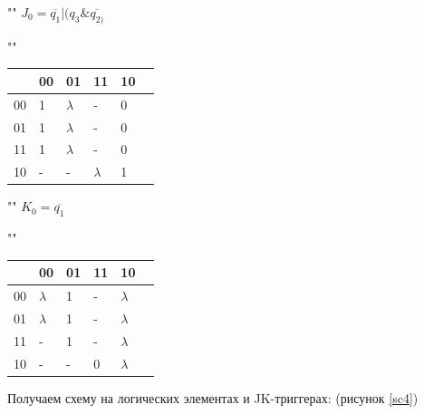 \begin{center}
	""\newline\newline
	$J_{0} = \overline{q_{1}} | (q_{3} \& \overline{q_{2)}}$
	
	""\newline
	\begin{tabular}{ | l | l | l | l | l | p{1cm} |}
		\hline
		\diagbox[width=5em]{$q_{3}q_{2}$}{$q_{1}q_{0}$} & 00 & 01 & 11 & 10 \\\hline
		00 & \cellcolor{blue!25} 1  & \cellcolor{blue!25} $\lambda$  & - & 0  \\\hline
		01 & \cellcolor{blue!25} 1  & \cellcolor{blue!25} $\lambda$  & - & 0  \\\hline
		11 & \cellcolor{blue!25} 1  & \cellcolor{blue!25} $\lambda$  & - & 0  \\\hline
		10 & \cellcolor{blue!25} -  & \cellcolor{blue!25} - & \cellcolor{blue!25} $\lambda$  & \cellcolor{blue!25} 1  \\ 
		\hline
	\end{tabular}

	""\newline\newline
	$K_{0} = \overline{q_{1}}$
	
	""\newline
	\begin{tabular}{ | l | l | l | l | l | p{1cm} |}
		\hline
		\diagbox[width=5em]{$q_{3}q_{2}$}{$q_{1}q_{0}$} & 00 & 01 & 11 & 10 \\\hline
		00 & \cellcolor{blue!25} $\lambda$  & \cellcolor{blue!25} 1  & - & $\lambda$  \\\hline
		01 & \cellcolor{blue!25} $\lambda$  & \cellcolor{blue!25} 1  & - & $\lambda$  \\\hline
		11 & \cellcolor{blue!25} -  & \cellcolor{blue!25} 1 & - & $\lambda$  \\\hline
		10 & \cellcolor{blue!25} -  & \cellcolor{blue!25} - & 0  & $\lambda$  \\ 
		\hline
	\end{tabular}

\end{center}

Получаем схему на логических элементах и JK-триггерах: (рисунок \ref{sc4})

